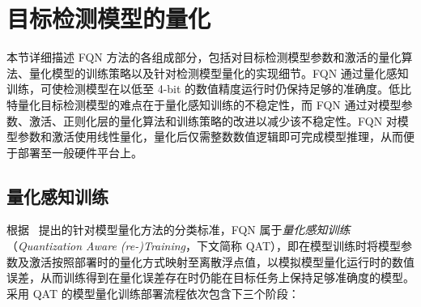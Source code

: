 \section{目标检测模型的量化} \label{sec::fqn::methods}
本节详细描述 FQN 方法的各组成部分，包括对目标检测模型参数和激活的量化算法、量化模型的训练策略以及针对检测模型量化的实现细节。FQN 通过量化感知训练，可使检测模型在以低至 4-bit 的数值精度运行时仍保持足够的准确度。低比特量化目标检测模型的难点在于量化感知训练的不稳定性，而 FQN 通过对模型参数、激活、正则化层的量化算法和训练策略的改进以减少该不稳定性。FQN 对模型参数和激活使用线性量化，量化后仅需整数数值逻辑即可完成模型推理，从而便于部署至一般硬件平台上。
\subsection{量化感知训练} \label{sec::fqn::qat_overview}
根据~\citet{krishnamoorthi2018quantizing} 提出的针对模型量化方法的分类标准，FQN 属于\emph{量化感知训练}（\emph{Quantization Aware (re-)Training}，下文简称 QAT），即在模型训练时将模型参数及激活按照部署时的量化方式映射至离散浮点值，以模拟模型量化运行时的数值误差，从而训练得到在量化误差存在时仍能在目标任务上保持足够准确度的模型。采用 QAT 的模型量化训练部署流程依次包含下三个阶段：
